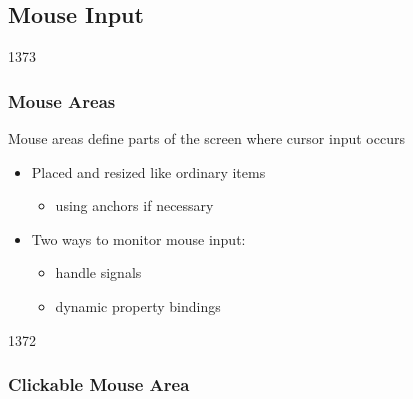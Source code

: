 %
%
%
%

\subsection{Mouse Input}
\begin{slide}{1373}\frametitle{Mouse Areas}

Mouse areas define parts of the screen where cursor input occurs

\begin{itemize}
\item Placed and resized like ordinary items
  \begin{itemize}
  \item using anchors if necessary
  \end{itemize}
\item Two ways to monitor mouse input:
  \begin{itemize}
  \item handle signals
  \item dynamic property bindings
  \end{itemize}
\end{itemize}


\end{slide}


\begin{slide}{1372}\frametitle{Clickable Mouse Area}

                                                            
\end{slide}

